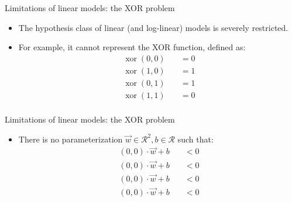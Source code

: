 \documentclass[handout]{beamer}
\begin{document}
\begin{frame}{Limitations of linear models: the XOR problem}
\begin{scriptsize}
\begin{itemize}
\item The hypothesis class of linear (and log-linear) models is severely restricted.
\item For example, it cannot represent the XOR function, defined as:
\begin{equation}
 \begin{split}
  \operatorname{xor}(0,0) \quad & = 0 \\
  \operatorname{xor}(1,0) \quad & = 1 \\
  \operatorname{xor}(0,1) \quad & = 1 \\
  \operatorname{xor}(1,1) \quad & = 0 \\
 \end{split}
\end{equation}
\end{itemize}
\end{scriptsize}
\end{frame}


\begin{frame}{Limitations of linear models: the XOR problem}
\begin{scriptsize}
\begin{itemize}
\item There is no parameterization $\vec{w} \in \mathcal{R}^2, b \in \mathcal{R}$ such that:
\begin{equation}
 \begin{split}
  (0,0) \cdot \vec{w} +b \quad & < 0 \\
  (0,0) \cdot \vec{w} +b \quad & < 0 \\
  (0,0) \cdot \vec{w} +b \quad & < 0 \\
  (0,0) \cdot \vec{w} +b \quad & < 0 \\
 \end{split}
\end{equation}
\end{itemize}
\end{scriptsize}
\end{frame}
\end{document}
